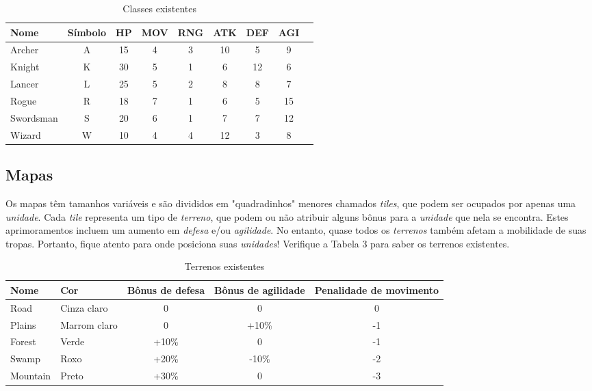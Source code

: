 \documentclass{article}
\begin{document}
\begin{table}[H]
\centering
\begin{tabular}{|l|c|c|c|c|c|c|c|c|}\hline
 \textbf{Nome} & \textbf{Símbolo} & \textbf{HP} & \textbf{MOV} & \textbf{RNG} & \textbf{ATK} & \textbf{DEF} & \textbf{AGI}\\\hline
Archer    & A & 15 & 4 & 3 & 10 &  5 &  9 \\\hline
Knight    & K & 30 & 5 & 1 &  6 & 12 &  6 \\\hline
Lancer    & L & 25 & 5 & 2 &  8 &  8 &  7 \\\hline
Rogue     & R & 18 & 7 & 1 &  6 &  5 & 15 \\\hline
Swordsman & S & 20 & 6 & 1 &  7 &  7 & 12 \\\hline
Wizard    & W & 10 & 4 & 4 & 12 &  3 &  8 \\\hline
\end{tabular}
\caption{Classes existentes}
\end{table}

\subsection{Mapas}
Os mapas têm tamanhos variáveis e são divididos em "quadradinhos" menores chamados \emph{tiles}, que podem ser ocupados por apenas uma \emph{unidade}. Cada \emph{tile} representa um tipo de \emph{terreno}, que podem ou não atribuir alguns bônus para a \emph{unidade} que nela se encontra. Estes aprimoramentos incluem um aumento em \emph{defesa} e/ou \emph{agilidade}. No entanto, quase todos os \emph{terrenos} também afetam a mobilidade de suas tropas. Portanto, fique atento para onde posiciona suas \emph{unidades}! Verifique a Tabela 3 para saber os terrenos existentes.

\begin{table}[H]
\centering
\begin{tabular}{|l|l|c|c|c|}\hline
 \textbf{Nome} & \textbf{Cor} & \textbf{Bônus de defesa} & \textbf{Bônus de agilidade} & \textbf{Penalidade de movimento}\\\hline
 Road     & Cinza claro  &   0   &   0   &  0 \\\hline
 Plains   & Marrom claro &   0   & +10\% & -1 \\\hline
 Forest   & Verde        & +10\% &   0   & -1 \\\hline
 Swamp    & Roxo         & +20\% & -10\% & -2 \\\hline
 Mountain & Preto        & +30\% &   0   & -3 \\\hline
\end{tabular}
\caption{Terrenos existentes}
\end{table}
\end{document}
